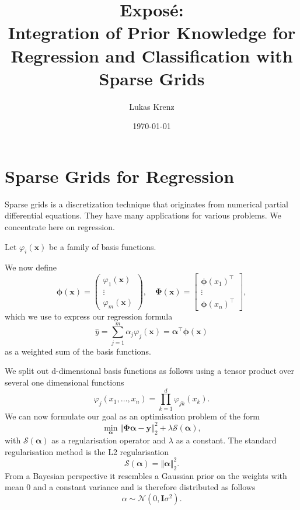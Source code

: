 \documentclass[11pt]{scrartcl}
\author{Lukas Krenz}
\date{\today}
\title{Exposé: \\ Integration of Prior Knowledge for Regression and
  Classification with Sparse Grids }
\begin{document}
\maketitle

\section{Sparse Grids for Regression}
\label{sec:orgheadline1}

Sparse grids is a discretization technique that originates from numerical partial differential equations.
They have many applications for various problems. We concentrate here on regression.

Let \( \varphi_i(\bm{x})\) be a family of basis functions.

We now define
\begin{equation}
\boldsymbol{\phi}(\boldsymbol{x}) = \begin{pmatrix}
  \varphi_1(\bm{x}) \\
  \vdots \\
  \varphi_m(\bm{x})
\end{pmatrix}
, \quad
\boldsymbol{\Phi}(\boldsymbol{x}) = \begin{bmatrix}
  \boldsymbol{\phi}(x_1)^\intercal\\
  \vdots \\
  \boldsymbol{\phi}(x_n)^\intercal
\end{bmatrix},
\end{equation}
which we use to express our regression formula
\begin{equation}
\hat{y} = \sum_{j = 1}^m \alpha_j \varphi_{j}(\bm{x}) = \boldsymbol{\alpha}^\intercal \bm{\phi} (\bm{x})
\end{equation}
as a weighted sum of the basis functions.

We split out d-dimensional basis functions as follows using a tensor product
over several one dimensional functions
\begin{equation}
\varphi_j (x_1, \ldots, x_n) = \prod_{k=1}^d \varphi_{jk} (x_k).
\end{equation}
We can now formulate our goal as an optimisation problem of the form
\begin{equation}
\min_{\bm{\alpha}} \left\Vert  \bm{\Phi} \bm{\alpha} - \bm{y}   \right\Vert_2^2  + \lambda \mathcal{S}(\bm{\alpha}), 
\end{equation}
with \(\mathcal{S}(\bm{\alpha})\) as a regularisation operator and \(\lambda\) as a constant.
The standard regularisation method is the L2 regularisation 
\begin{equation}
\mathcal{S}(\bm{\alpha}) = \left\Vert \bm{\alpha} \right\Vert_2^2.
\end{equation}
From a Bayesian perspective it resembles a Gaussian prior on the weights with mean 0 and
a constant variance  and is therefore distributed as follows
\begin{equation}
\alpha \sim \mathcal{N} (0, \bm{I} \sigma^2 ).
\end{equation}
\end{document}
